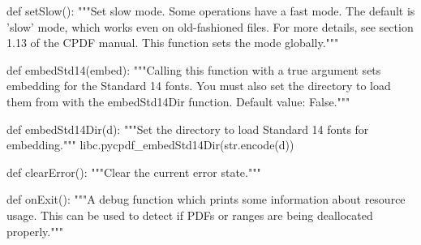 def setSlow():
    """Set slow mode. Some operations have a fast mode. The default is 'slow'
    mode, which works even on old-fashioned files. For more details, see
    section 1.13 of the CPDF manual. This function sets the mode globally."""

def embedStd14(embed):
    """Calling this function with a true argument sets embedding for the
    Standard 14 fonts.  You must also set the directory to load them from with
    the embedStd14Dir function. Default value: False."""

def embedStd14Dir(d):
    """Set the directory to load Standard 14 fonts for embedding."""
    libc.pycpdf_embedStd14Dir(str.encode(d))

def clearError():
    """Clear the current error state."""

def onExit():
    """A debug function which prints some information about
    resource usage. This can be used to detect if PDFs or ranges are being
    deallocated properly."""
